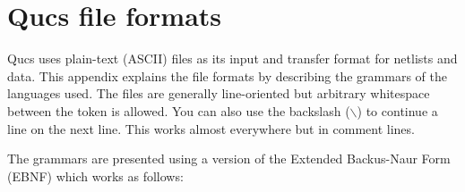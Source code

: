 %
%
%
%

\chapter{Qucs file formats}
\label{sec:qucsfiles}

%
%
\newcommand\tok[1]{`{\bf #1}'}  %
\newcommand\ntok[1]{{\bf #1}}   %
\newcommand\bsl[1]{\tok{$\backslash$#1}}
\newenvironment{grammar}%
  {\newcommand\produces[2]{##1 \> $\rightarrow$ \> ##2 \\}
   \newcommand\orproduces[1]{\> \> \makebox[0pt][r]{$|$ }##1 \\}
   \newcommand\opt[1]{[ ##1 ]}
   \newcommand\rep[1]{\{ ##1 \}}
   \newcommand\alt[0]{$|$}
   \newcommand\group[1]{( ##1 )}
   \newcommand\emptyprod{{$\varepsilon$}}
   \newcommand\heading[1]{\rule{\linewidth}{1pt} \\{\bf ##1}\\[2ex]}
   \newcommand\separator{\rule{\linewidth}{1pt} \\}
   \begin{tabbing}
   \qquad\qquad\qquad\qquad \= \qquad \= \kill}
  {\end{tabbing}}

\def\REalpha{\tok{a} \alt{}~\dots~\alt{} \tok{z} \alt{}
             \tok{A} \alt{}~\dots~\alt{} \tok{Z}}
\def\REalnum{\REalpha \alt{} \tok{0}~\dots~\tok{9} \alt{} \tok{\_}}
\def\REplusminus{\opt{\tok{+} \alt{} \tok{-}}}

%
%
Qucs uses plain-text (ASCII) files as its input and transfer format for
netlists and data. This appendix explains the file formats by
describing the grammars of the languages used. The files are generally
line-oriented but arbitrary whitespace between the token is
allowed. You can also use the backslash ($\backslash$) to continue a
line on the next line. This works almost everywhere but in
comment lines.

\addvspace{12pt}

The grammars are presented using a version of the Extended Backus-Naur
Form (EBNF) which works as follows:

